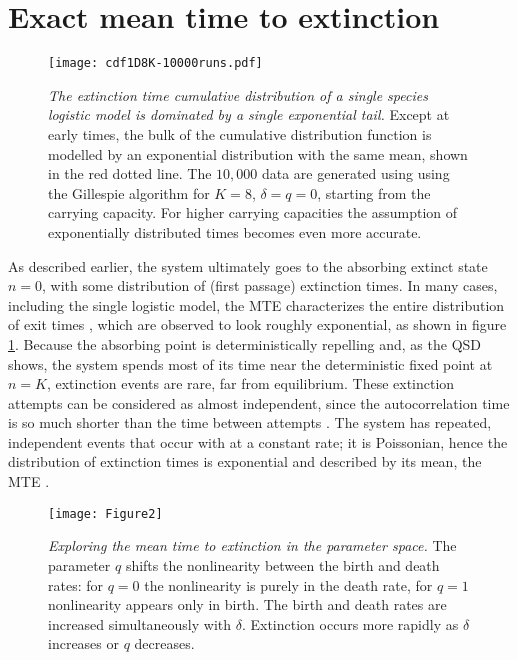 \section{Exact mean time to extinction}%

\begin{figure}[h]
	\centering
	\texttt{[image: cdf1D8K-10000runs.pdf]}
	\caption{\emph{The extinction time cumulative distribution of a single species logistic model is dominated by a single exponential tail.} 
	Except at early times, the bulk of the cumulative distribution function is modelled by an exponential distribution with the same mean, shown in the red dotted line. 
	The $10,000$ data are generated using using the Gillespie algorithm for $K=8$, $\delta=q=0$, starting from the carrying capacity. For higher carrying capacities the assumption of exponentially distributed times becomes even more accurate. 
	} \label{etimedistr}
\end{figure}

As described earlier, the system ultimately goes to the absorbing extinct state $n=0$, with some distribution of (first passage) extinction times. %
In many cases, including the single logistic model, the MTE characterizes the entire distribution of exit times \cite{Hanggi1990,Bel2010}, which are observed to look roughly exponential, as shown in figure \ref{etimedistr}.  
Because the absorbing point is deterministically repelling and, as the QSD shows, the system spends most of its time near the deterministic fixed point at $n=K$, extinction events are rare, far from equilibrium. %
These extinction attempts can be considered as almost independent, since the autocorrelation time is so much shorter than the time between attempts \cite{Hanggi1990,Lande1993}. %
The system has repeated, independent events that occur with at a constant rate; it is Poissonian, hence the distribution of extinction times is exponential and described by its mean, the MTE \cite{Hanggi1990,Leigh1981,Lande1993,Foley1994}. 

\begin{figure}[h]
	\centering
	\texttt{[image: Figure2]}
	\caption{\emph{Exploring the mean time to extinction in the parameter space.} The parameter $q$ shifts the nonlinearity between the birth and death rates: for $q=0$ the nonlinearity is purely in the death rate, for $q=1$ nonlinearity appears only in birth. The birth and death rates are increased simultaneously with $\delta$. Extinction occurs more rapidly as $\delta$ increases or $q$ decreases. } \label{mteCP}
\end{figure}

